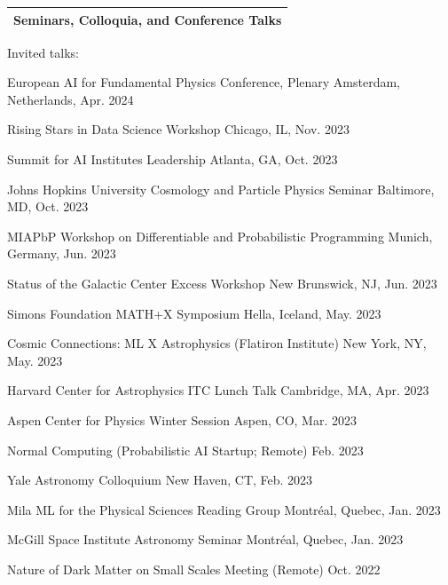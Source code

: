 \documentclass[letterpaper,11pt]{article}
\newenvironment{packed_itemize}{
\begin{itemize}[label=\raisebox{0.25ex}{\tiny$\bullet$}]
  \setlength{\itemsep}{4.2pt}
  \setlength{\parskip}{0pt}
  \setlength{\parsep}{0pt}}{\end{itemize}
}
\begin{document}


\noindent
\begin{tabular*}{\textwidth}{l@{\extracolsep{\fill}}}
\large {\sc \Large{Seminars, Colloquia, and Conference Talks}}\\
\hline
\end{tabular*}\vspace{3.5mm}

\noindent
Invited talks:
\begin{packed_itemize}
  \item European AI for Fundamental Physics Conference, Plenary \hfill Amsterdam, Netherlands, Apr. 2024
  \item Rising Stars in Data Science Workshop \hfill Chicago, IL, Nov. 2023
  \item Summit for AI Institutes Leadership \hfill Atlanta, GA, Oct. 2023
  \item Johns Hopkins University Cosmology and Particle Physics Seminar \hfill Baltimore, MD, Oct. 2023
  \item MIAPbP Workshop on Differentiable and Probabilistic Programming \hfill Munich, Germany, Jun. 2023
  \item Status of the Galactic Center Excess Workshop \hfill New Brunswick, NJ, Jun. 2023
  \item Simons Foundation MATH+X Symposium \hfill Hella, Iceland, May. 2023
  \item Cosmic Connections: ML X Astrophysics (Flatiron Institute) \hfill New York, NY, May. 2023
  \item Harvard Center for Astrophysics ITC Lunch Talk  \hfill Cambridge, MA, Apr. 2023
  \item Aspen Center for Physics Winter Session \hfill Aspen, CO, Mar. 2023
  \item Normal Computing (Probabilistic AI Startup; Remote) \hfill Feb. 2023
  \item Yale Astronomy Colloquium \hfill New Haven, CT, Feb. 2023
  \item Mila ML for the Physical Sciences Reading Group \hfill Montr\'eal, Quebec, Jan. 2023
  \item McGill Space Institute Astronomy Seminar \hfill Montr\'eal, Quebec, Jan. 2023
  \item Nature of Dark Matter on Small Scales Meeting (Remote) \hfill  Oct. 2022

\end{packed_itemize}
\end{document}
